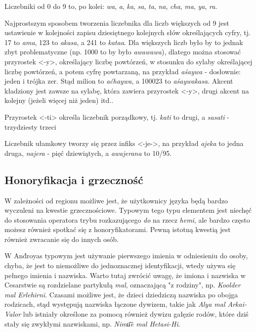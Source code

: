 


Liczebniki od 0 do 9 to, po kolei: \emph{wa}, \emph{a}, \emph{ka}, \emph{sa}, 
\emph{ta}, \emph{na}, \emph{cha}, \emph{ma}, \emph{ya}, \emph{ra}.

Najprostszym sposobem tworzenia liczebnika dla liczb większych od 9 jest 
ustawienie w kolejności zapisu dziesiętnego kolejnych słów określających cyfry,
tj. 17 to \emph{ama}, 123 to \emph{akasa}, a 241 to \emph{kataa}. Dla większych
liczb było by to jednak zbyt problematyczne (np. 1000 to by było 
\emph{awawawa}), dlatego można stosować przyrostek <-y>, określający liczbę 
powtórzeń, w stosunku do sylaby określającej liczbę powtórzeń, a potem cyfrę 
powtarzaną, na przykład \emph{aśaywa} - dosłownie: jeden i trójka zer. Stąd 
milion to \emph{aćhaywa}, a 100023 to \emph{aśaywakasa}. Akcent kładziony jest 
zawsze na sylabę, która zawiera przyrostek <-y>, drugi akcent na kolejny 
(jeżeli więcej niż jeden) itd..

Przyrostek <-ti> określa liczebnik porządkowy, tj. \emph{kati} to drugi, 
a \emph{sasati} - trzydziesty trzeci

Liczebnik ułamkowy tworzy się przez infiks <-je->, na przykład \emph{ajeka} to 
jedna druga, \emph{najera} - pięć dziewiątych, a \emph{awajerana} to 10/95.

\subsection{Honoryfikacja i grzeczność}

W zależności od regionu możliwe jest, że użytkownicy języka będą bardzo
wyczuleni na kwestie grzecznościowe. Typowym tego typu elementem jest niechęć
do stosowania operatora trybu rozkazującego \emph{do} na rzecz \emph{hemi},
ale bardzo często możesz również spotkać się z honoryfikatorami. Pewną istotną
kwestią jest również zwracanie się do innych osób.

W And́royas typowym jest używanie pierwszego imienia w odniesieniu do osoby,
chyba, że jest to niemożliwe do jednoznacznej identyfikacji, wtedy używa się
pełnego imienia i nazwiska. Warto tutaj zwrócić uwagę, że imiona i nazwiska
w Cesarstwie są rozdzielane partykułą \emph{mal}, oznaczającą "z rodziny",
np. \emph{Koolder mal Erlehirni}. Czasami możliwe jest, że dzieci dziedziczą
nazwiska po obojga rodzicach, stąd występują nazwiska łączone dywizem,
takie jak \emph{Alya mal Arkai-Valor} lub istniały określone za pomocą również
dywizu gałęzie rodów, które dziś stały się zwykłymi nazwiskami, np. \emph{Nimu͞e 
mal Hetasi-Hi}.

